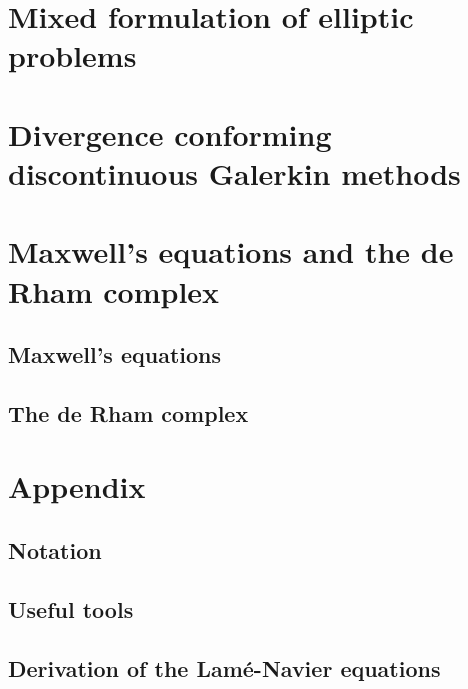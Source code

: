 \chapter{Mixed formulation of elliptic problems}
\label{cha:darcy}


\chapter{Divergence conforming discontinuous Galerkin methods}
\label{cha:hdivdg}


\chapter{Maxwell's equations and the de Rham complex}
\section{Maxwell's equations}
\label{cha:maxwell}


\section{The de Rham complex}
\label{cha:derham}


\appendix
\chapter{Appendix}
\section{Notation}



\section{Useful tools}


\section{Derivation of the Lamé-Navier equations}
\label{sec:lame-navier}




\printindex


